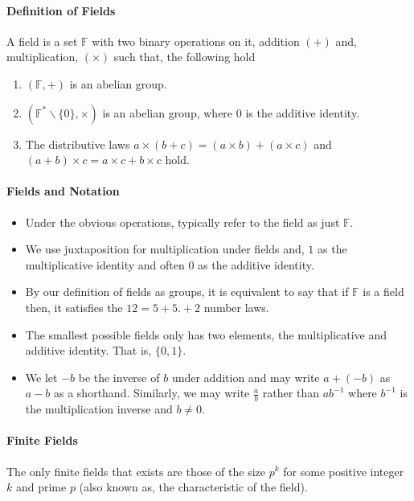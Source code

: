 \paragraph{Definition of Fields}
A field is a set \(\mathbb{F}\) with two binary operations on it,
addition \((+)\) and, multiplication, \((\times)\) such that, the following
hold
\begin{enumerate}
    \item \((\mathbb{F}, +)\) is an abelian group.
    \item \((\mathbb{F}^*\backslash \{0\}, \times)\) is an abelian group, where
    \(0\) is the additive identity.
    \item The distributive laws \(a\times (b+c) = (a\times b) + (a\times c)\)
    and \((a+b)\times c = a\times c + b\times c\) hold.
\end{enumerate}


\paragraph{Fields and Notation}
\begin{itemize}
    \item Under the obvious operations, typically refer to the field as
    just \(\mathbb{F}\).
    \item We use juxtaposition for multiplication under fields and, \(1\) as
    the multiplicative identity and often \(0\) as the additive identity.
    \item By our definition of fields as groups, it is equivalent to say
    that if \(\mathbb{F}\) is a field then, it satisfies the
    \(12 = 5 + 5 . + 2\) number laws.
    \item The smallest possible fields only has two elements, the
    multiplicative and additive identity. That is, \(\{0, 1\}\).
    \item We let \(-b\) be the inverse of \(b\) under addition and may write
    \(a + (-b)\) as \(a - b\) as a shorthand. Similarly, we may write
    \(\frac{a}{b}\) rather than \(ab^{-1}\) where \(b^{-1}\) is the
    multiplication inverse and \(b\neq 0\).
\end{itemize}

\paragraph{Finite Fields}
The only finite fields that exists are those of the size \(p^k\) for some
positive integer \(k\)  and prime \(p\) (also known as, the characteristic
of the field).

